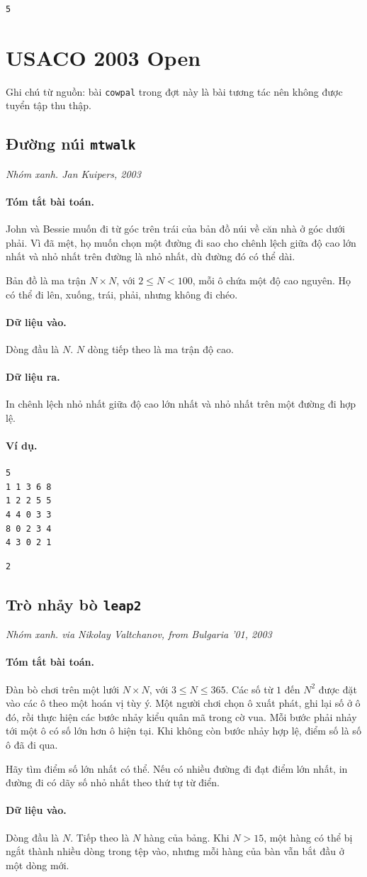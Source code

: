 \documentclass[11pt]{article}
\newcommand{\problem}[4]{%
  \subsection[#1 (#2)]{#1 \hfill {\normalsize\texttt{#2}}}%
  \noindent\textit{#3. #4}\par\smallskip
}
\newcommand{\iosec}[1]{\paragraph{#1}}
\begin{document}
\begin{verbatim}
5
\end{verbatim}

\section{USACO 2003 Open}

Ghi chú từ nguồn: bài \texttt{cowpal} trong đợt này là bài tương tác nên không
được tuyển tập thu thập.

\problem{Đường núi}{mtwalk}{Nhóm xanh}{Jan Kuipers, 2003}

\iosec{Tóm tắt bài toán.}
John và Bessie muốn đi từ góc trên trái của bản đồ núi về căn nhà ở góc dưới
phải. Vì đã mệt, họ muốn chọn một đường đi sao cho chênh lệch giữa độ cao lớn
nhất và nhỏ nhất trên đường là nhỏ nhất, dù đường đó có thể dài.

Bản đồ là ma trận \(N\times N\), với \(2\le N<100\), mỗi ô chứa một độ cao
nguyên. Họ có thể đi lên, xuống, trái, phải, nhưng không đi chéo.

\iosec{Dữ liệu vào.}
Dòng đầu là \(N\). \(N\) dòng tiếp theo là ma trận độ cao.

\iosec{Dữ liệu ra.}
In chênh lệch nhỏ nhất giữa độ cao lớn nhất và nhỏ nhất trên một đường đi hợp
lệ.

\iosec{Ví dụ.}
\begin{verbatim}
5
1 1 3 6 8
1 2 2 5 5
4 4 0 3 3
8 0 2 3 4
4 3 0 2 1
\end{verbatim}

\begin{verbatim}
2
\end{verbatim}

\problem{Trò nhảy bò}{leap2}{Nhóm xanh}{via Nikolay Valtchanov, from Bulgaria '01, 2003}

\iosec{Tóm tắt bài toán.}
Đàn bò chơi trên một lưới \(N\times N\), với \(3\le N\le 365\). Các số từ
\(1\) đến \(N^2\) được đặt vào các ô theo một hoán vị tùy ý. Một người chơi
chọn ô xuất phát, ghi lại số ở ô đó, rồi thực hiện các bước nhảy kiểu quân mã
trong cờ vua. Mỗi bước phải nhảy tới một ô có số lớn hơn ô hiện tại. Khi không
còn bước nhảy hợp lệ, điểm số là số ô đã đi qua.

Hãy tìm điểm số lớn nhất có thể. Nếu có nhiều đường đi đạt điểm lớn nhất, in
đường đi có dãy số nhỏ nhất theo thứ tự từ điển.

\iosec{Dữ liệu vào.}
Dòng đầu là \(N\). Tiếp theo là \(N\) hàng của bảng. Khi \(N>15\), một hàng có
thể bị ngắt thành nhiều dòng trong tệp vào, nhưng mỗi hàng của bàn vẫn bắt đầu
ở một dòng mới.
\end{document}
